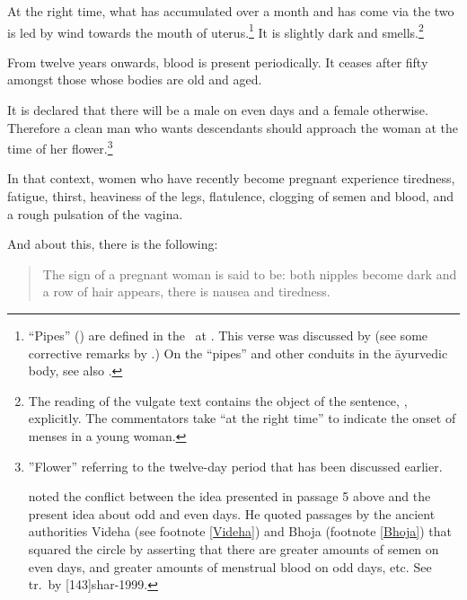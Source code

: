 \begin{translation}


\item[3.3.10]

At the right time, what has accumulated over a month and has come via
the two  is led by wind towards the mouth of
uterus.\footnote{“Pipes” () are defined in the \SS\ at
    . This verse was discussed by
    \citet[64--66]{das-2003} (see some corrective remarks by
    \citet{voge-2005}.) On the “pipes” and other conduits in the āyurvedic
    body, see also \cite[404--406]{wuja-2022}.}  It is slightly dark and
    smells.\footnote{The reading of the vulgate text contains the object
        of the sentence, , explicitly.  The commentators
        take “at the right time” to indicate the onset of menses in a young
        woman.}

\item[3.3.11]

 From twelve years onwards, blood is present periodically. It ceases
after fifty amongst those whose bodies are old and aged.

\item[3.3.12]

It is declared that there will be a male on even days and a female otherwise. 
Therefore a clean man who wants descendants should approach the woman at the 
time of her flower.\footnote{”Flower” referring to the twelve-day period that has 
been discussed earlier.

 noted the conflict between the idea presented in
passage 5 above and the present idea about odd and even days. He
quoted passages by the ancient authorities Videha (see footnote
\ref{Videha}) and Bhoja (footnote \ref{Bhoja}) that squared the
circle by asserting that there are greater amounts of semen on even
days, and greater amounts of menstrual blood on odd days, etc.  See tr.\ by
[143]{shar-1999}.}


\item [3.3.13]

In that context, women who have recently become pregnant experience 
tiredness,
fatigue,
thirst,
heaviness of the legs,
flatulence,
clogging of semen and blood,
and a rough pulsation of the vagina.

\item [3.3.14ab]

And about this, there is the following:

\begin{quote}
    The sign of a pregnant woman is said to be: both nipples become
dark and a row of hair appears, there is nausea
and tiredness.
\end{quote}


\end{translation}
